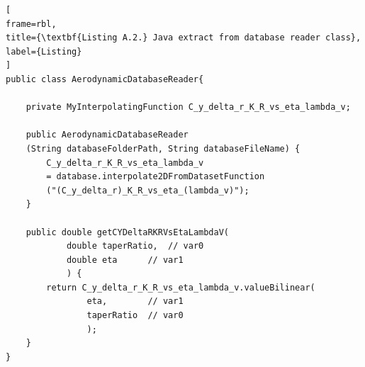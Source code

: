 \newpage
\lstset{language=Java}
\begin{lstlisting}[
frame=rbl,
title={\textbf{Listing A.2.} Java extract from database reader class},
label={Listing}
]
public class AerodynamicDatabaseReader{

	private MyInterpolatingFunction C_y_delta_r_K_R_vs_eta_lambda_v;

	public AerodynamicDatabaseReader
	(String databaseFolderPath, String databaseFileName) {
		C_y_delta_r_K_R_vs_eta_lambda_v
		= database.interpolate2DFromDatasetFunction
		("(C_y_delta_r)_K_R_vs_eta_(lambda_v)");
	}

	public double getCYDeltaRKRVsEtaLambdaV(
			double taperRatio,	// var0
			double eta		// var1
			) {
		return C_y_delta_r_K_R_vs_eta_lambda_v.valueBilinear(
				eta,		// var1
				taperRatio	// var0
				);
	}
}
\end{lstlisting}